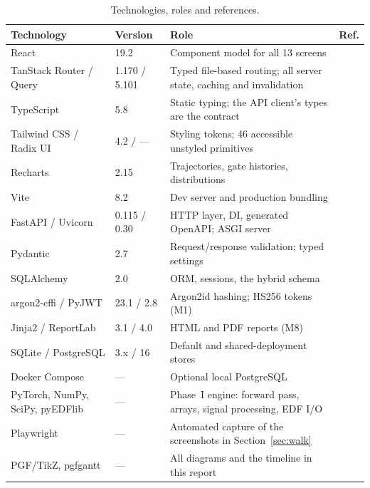 \documentclass[11pt,a4paper]{article}
\begin{document}
\begin{table}[H]\centering\caption{Technologies, roles and references.}
\label{tab:tech}\scriptsize
\begin{tabularx}{\linewidth}{@{}L{2.5cm} C{1.25cm} Y L{1.3cm}@{}}
\toprule
\textbf{Technology} & \textbf{Version} & \textbf{Role} & \textbf{Ref.} \\
\midrule
React & 19.2 & Component model for all 13 screens & \cite{react} \\
TanStack Router / Query & 1.170 / 5.101 & Typed file-based routing; all server state, caching and invalidation & \cite{tanstack} \\
TypeScript & 5.8 & Static typing; the API client's types are the contract & \cite{typescript} \\
Tailwind CSS / Radix UI & 4.2 / --- & Styling tokens; 46 accessible unstyled primitives & \cite{tailwind,radix} \\
Recharts & 2.15 & Trajectories, gate histories, distributions & \cite{recharts} \\
Vite & 8.2 & Dev server and production bundling & \cite{vite} \\
FastAPI / Uvicorn & 0.115 / 0.30 & HTTP layer, DI, generated OpenAPI; ASGI server & \cite{fastapi,uvicorn} \\
Pydantic & 2.7 & Request/response validation; typed settings & \cite{pydantic} \\
SQLAlchemy & 2.0 & ORM, sessions, the hybrid schema & \cite{sqlalchemy} \\
argon2-cffi / PyJWT & 23.1 / 2.8 & Argon2id hashing; HS256 tokens (M1) & \cite{argon2cffi,pyjwt} \\
Jinja2 / ReportLab & 3.1 / 4.0 & HTML and PDF reports (M8) & \cite{jinja,reportlab} \\
SQLite / PostgreSQL & 3.x / 16 & Default and shared-deployment stores & \cite{sqlite,postgresql} \\
Docker Compose & --- & Optional local PostgreSQL & \cite{dockercompose} \\
PyTorch, NumPy, SciPy, pyEDFlib & --- & Phase~I engine: forward pass, arrays, signal processing, EDF I/O & \cite{paszke2019,harris2020,virtanen2020,pyedflib} \\
Playwright & --- & Automated capture of the screenshots in Section~\ref{sec:walk} & \cite{playwright} \\
PGF/TikZ, pgfgantt & --- & All diagrams and the timeline in this report & \cite{tikz,pgfgantt} \\
\bottomrule
\end{tabularx}
\end{table}
\end{document}
